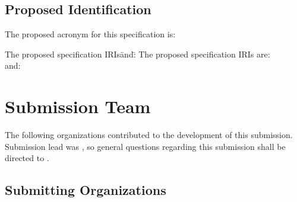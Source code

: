 {\subsection{Proposed Identification}
The proposed acronym for this specification is: \specacro
\begin{tabbing}
The proposed specification IRIs\=and:\= \kill 
The proposed specification IRIs are:\>\>\ {\small{}}\\
\> and:\>\ {\small{}}
\end{tabbing}
\ifthenelse{\equal{\iprmode}{\xspace}}
{}
{}
\section{Submission Team}
The following organizations contributed to the development of this submission. Submission lead was \leadsubmitter, so general questions regarding this submission shall be directed to \leadsubmitter.

\subsection{Submitting Organizations}
\newcommand{\submittersexample}{
\begin{itemize}
\item Company X\\ 
John Smith\\
john@companyx.com
\item Company Y, Inc.\\
Dr. Jane Doe\\
jdoe@companyy.com
\end{itemize}
}
{}
{
    \suborgs
}



}
